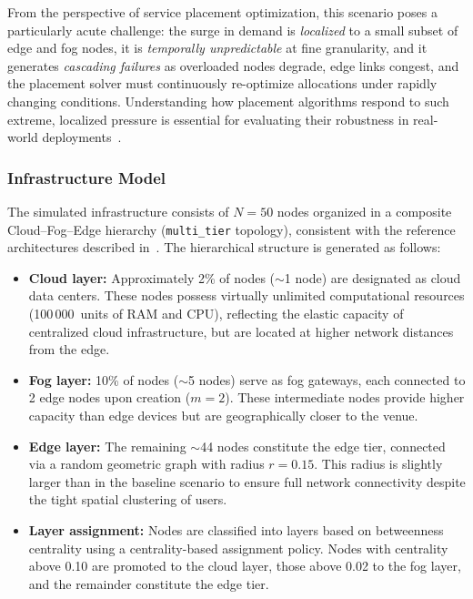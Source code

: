 From the perspective of service placement optimization, this scenario poses a particularly acute challenge: the surge in demand is \emph{localized} to a small subset of edge and fog nodes, it is \emph{temporally unpredictable} at fine granularity, and it generates \emph{cascading failures} as overloaded nodes degrade, edge links congest, and the placement solver must continuously re-optimize allocations under rapidly changing conditions. Understanding how placement algorithms respond to such extreme, localized pressure is essential for evaluating their robustness in real-world deployments~\cite{Armeniakos2025Stochastic, Fernando2025On}.

\subsubsection{Infrastructure Model}

The simulated infrastructure consists of $N = 50$ nodes organized in a composite Cloud--Fog--Edge hierarchy (\texttt{multi\_tier} topology), consistent with the reference architectures described in~\cite{Armeniakos2025Stochastic, Fernando2025On}. The hierarchical structure is generated as follows:

\begin{itemize}
    \item \textbf{Cloud layer:} Approximately 2\% of nodes ($\sim$1 node) are designated as cloud data centers. These nodes possess virtually unlimited computational resources (100\,000~units of RAM and CPU), reflecting the elastic capacity of centralized cloud infrastructure, but are located at higher network distances from the edge.
    
    \item \textbf{Fog layer:} 10\% of nodes ($\sim$5 nodes) serve as fog gateways, each connected to 2 edge nodes upon creation ($m = 2$). These intermediate nodes provide higher capacity than edge devices but are geographically closer to the venue.
    
    \item \textbf{Edge layer:} The remaining $\sim$44 nodes constitute the edge tier, connected via a random geometric graph with radius $r = 0.15$. This radius is slightly larger than in the baseline scenario to ensure full network connectivity despite the tight spatial clustering of users.
    
    \item \textbf{Layer assignment:} Nodes are classified into layers based on betweenness centrality using a centrality-based assignment policy. Nodes with centrality above 0.10 are promoted to the cloud layer, those above 0.02 to the fog layer, and the remainder constitute the edge tier.
\end{itemize}

